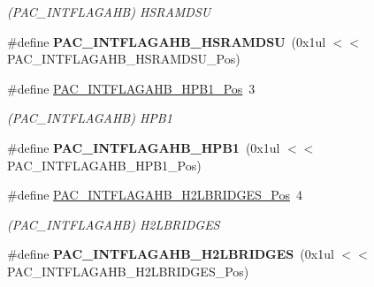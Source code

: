 \begin{DoxyCompactItemize}
\begin{DoxyCompactList}\small\item\em (P\+A\+C\+\_\+\+I\+N\+T\+F\+L\+A\+G\+A\+H\+B) H\+S\+R\+A\+M\+D\+S\+U \end{DoxyCompactList}\item 
\hypertarget{group___s_a_m_l21___p_a_c_gab6f48987fe4ddf11eb0758d279df5e5a}{}\#define {\bfseries P\+A\+C\+\_\+\+I\+N\+T\+F\+L\+A\+G\+A\+H\+B\+\_\+\+H\+S\+R\+A\+M\+D\+S\+U}~(0x1ul $<$$<$ P\+A\+C\+\_\+\+I\+N\+T\+F\+L\+A\+G\+A\+H\+B\+\_\+\+H\+S\+R\+A\+M\+D\+S\+U\+\_\+\+Pos)\label{group___s_a_m_l21___p_a_c_gab6f48987fe4ddf11eb0758d279df5e5a}

\item 
\hypertarget{group___s_a_m_l21___p_a_c_gafa1c35302b965176e72cad01c2f93bdf}{}\#define \hyperlink{group___s_a_m_l21___p_a_c_gafa1c35302b965176e72cad01c2f93bdf}{P\+A\+C\+\_\+\+I\+N\+T\+F\+L\+A\+G\+A\+H\+B\+\_\+\+H\+P\+B1\+\_\+\+Pos}~3\label{group___s_a_m_l21___p_a_c_gafa1c35302b965176e72cad01c2f93bdf}

\begin{DoxyCompactList}\small\item\em (P\+A\+C\+\_\+\+I\+N\+T\+F\+L\+A\+G\+A\+H\+B) H\+P\+B1 \end{DoxyCompactList}\item 
\hypertarget{group___s_a_m_l21___p_a_c_ga36acbd600e4c9f4cd1ca2706073e8942}{}\#define {\bfseries P\+A\+C\+\_\+\+I\+N\+T\+F\+L\+A\+G\+A\+H\+B\+\_\+\+H\+P\+B1}~(0x1ul $<$$<$ P\+A\+C\+\_\+\+I\+N\+T\+F\+L\+A\+G\+A\+H\+B\+\_\+\+H\+P\+B1\+\_\+\+Pos)\label{group___s_a_m_l21___p_a_c_ga36acbd600e4c9f4cd1ca2706073e8942}

\item 
\hypertarget{group___s_a_m_l21___p_a_c_ga8f582c325f9ac031b98ce2e3e061f9c3}{}\#define \hyperlink{group___s_a_m_l21___p_a_c_ga8f582c325f9ac031b98ce2e3e061f9c3}{P\+A\+C\+\_\+\+I\+N\+T\+F\+L\+A\+G\+A\+H\+B\+\_\+\+H2\+L\+B\+R\+I\+D\+G\+E\+S\+\_\+\+Pos}~4\label{group___s_a_m_l21___p_a_c_ga8f582c325f9ac031b98ce2e3e061f9c3}

\begin{DoxyCompactList}\small\item\em (P\+A\+C\+\_\+\+I\+N\+T\+F\+L\+A\+G\+A\+H\+B) H2\+L\+B\+R\+I\+D\+G\+E\+S \end{DoxyCompactList}\item 
\hypertarget{group___s_a_m_l21___p_a_c_ga2c53fd04865409cde86e983d79ca7a5c}{}\#define {\bfseries P\+A\+C\+\_\+\+I\+N\+T\+F\+L\+A\+G\+A\+H\+B\+\_\+\+H2\+L\+B\+R\+I\+D\+G\+E\+S}~(0x1ul $<$$<$ P\+A\+C\+\_\+\+I\+N\+T\+F\+L\+A\+G\+A\+H\+B\+\_\+\+H2\+L\+B\+R\+I\+D\+G\+E\+S\+\_\+\+Pos)\label{group___s_a_m_l21___p_a_c_ga2c53fd04865409cde86e983d79ca7a5c}


\end{DoxyCompactItemize}
